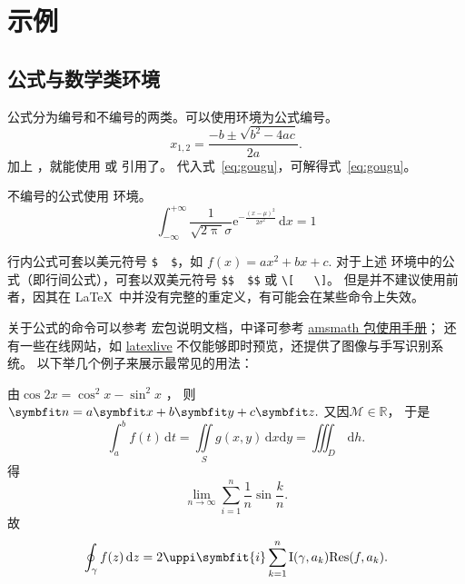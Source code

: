 \chapter{示例}\label{chap:CodeIntro}
\section{公式与数学类环境}\label{subsec:eqandmath}
公式分为编号和不编号的两类。可以使用环境为公式编号。
\begin{equation}\label{eq:gougu}
	x_{1,2}=\frac{-b \pm \sqrt{b^2-4ac}}{2a}.
\end{equation}
加上 ，就能使用 或 引用了。
代入式~\ref{eq:gougu}，可解得式~\eqref{eq:gougu}。

不编号的公式使用  环境。
\begin{equation*}
	\int_{-\infty}^{+\infty}\frac{1}{\sqrt{2\uppi}\sigma}		%
	\mathrm{e}^{-\tfrac{(x-\mu)^2}{2\sigma^2}} \,\mathrm{d}x =1
\end{equation*}

行内公式可套以美元符号 \verb+$  $+，如 $f(x)=ax^2+bx+c$.
对于上述  环境中的公式（即行间公式），可套以双美元符号 \verb+$$  $$+
或 \verb+\[   \]+。
但是并不建议使用前者，因其在 \LaTeX\ 中并没有完整的重定义，有可能会在某些命令上失效。

关于公式的命令可以参考  宏包说明文档，中译可参考 \href{http://static.latexstudio.net/article/2019/0204/amsmath-guide-zh-cn.pdf}{amsmath 包使用手册}；
还有一些在线网站，如 \href{https://latexlive.com/}{latexlive} 不仅能够即时预览，还提供了图像与手写识别系统。
以下举几个例子来展示最常见的用法：

由$\cos 2x=\cos^2x-\sin^2x$ ，	%
则$\Vector{n}=a\Vector{x}+b\Vector{y}+c\Vector{z}.$	%
又因$\mathcal{M}\in \mathbb{R}$，			%
于是
\[
	\int_a^b f(t)\,\mathrm{d}t = \iint\limits_S g(x,y)\,\mathrm{d}x\mathrm{d}y
	= \iiint\nolimits_D\, \mathrm{d}h.	%
\]
得
\[\lim_{n \to \infty}\sum_{i=1}^n{\frac{1}{n}}\sin\frac{k}{n}.\]	%
故
\begin{equation}\label{eq:res}
	\oint_{\gamma}f(z)\,\mathrm{d}z=2\uppi\symbfit{i}\sum^n_{k=1}\mathrm{I}(\gamma,a_k)\mathrm{Res}(f,a_k).
\end{equation}

